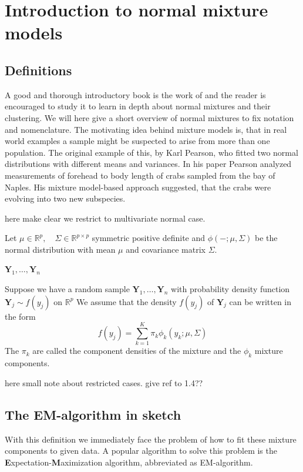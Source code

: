 \chapter{Introduction to normal mixture models}


\section{Definitions}

A good and thorough introductory book is the work of \cite{McL00} and
the reader is encouraged to study it to learn in depth about normal mixtures
and their clustering. 
We will here give a short overview of normal mixtures to fix notation and 
nomenclature.
The motivating idea behind mixture models is, that in real world examples
a sample might be suspected to arise from more than one population.
The original example of this, by Karl Pearson, who fitted two normal 
distributions with different means and variances.
In his paper Pearson analyzed measurements of forehead to body length of crabs
sampled from the bay of Naples. His mixture model-based approach suggested, 
that the crabs were evolving into two new subspecies.

here make clear we restrict to multivariate normal case.

Let $ \mu \in \mathbb{R}^p , \quad \Sigma \in \mathbb{R}^{p \times p} $ 
symmetric positive definite and $ \phi(- ; \mu, \Sigma) $ be the normal 
distribution with mean $ \mu $ and covariance matrix $ \Sigma $.


$ \pmb{Y}_1, \dots , \pmb{Y}_n $

\begin{definition}
    Suppose we have a random sample $ \pmb{Y}_1, \dots , \pmb{Y}_n $ with 
    probability density function $ \pmb{Y}_j \sim f(y_j) $ on 
    $\mathbb{R}^p$ We assume that the density $ f(y_j) $ of $ \pmb{Y}_j $ can 
    be written in the form 
    \[ f(y_j) = \sum_{k=1}^{K} \pi_k \phi_k (y_k; \mu, \Sigma) \]
    The $ \pi_k $ are called the component densities of the mixture and the 
    $\phi_k$ mixture components.
\end{definition}

here small note about restricted cases. give ref to 1.4??

\section{The EM-algorithm in sketch}

With this definition we immediately face the problem of how to fit these
mixture components to given data. A popular algorithm to solve this problem 
is the {\bf E}xpectation-{\bf M}aximization algorithm, abbreviated as 
EM-algorithm.

